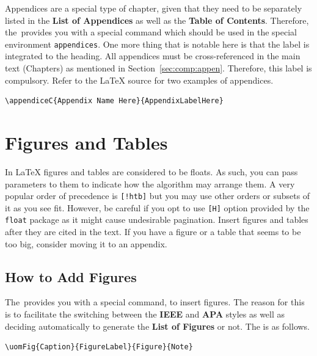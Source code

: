 \documentclass[12pt]{uomthesis}
\begin{document}
Appendices are a special type of chapter, given that they need to be separately listed in the \textbf{List of Appendices} as well as the \textbf{Table of Contents}. Therefore, the~\TheClass provides you with a special command  which should be used in the special environment \texttt{appendices}. One more thing that is notable here is that the label is integrated to the heading. All appendices must be cross-referenced in the main text (Chapters) as mentioned in Section~\ref{sec:comp:appen}. Therefore, this label is compulsory. Refer to the \LaTeX{} source for two examples of appendices.

\begin{indentedQuote}
\begin{verbatim}
\appendiceC{Appendix Name Here}{AppendixLabelHere}
\end{verbatim}
\end{indentedQuote}


\section{Figures and Tables}
\label{Sec:Latex:FigTab}

In \LaTeX{} figures and tables are considered to be floats. As such, you can pass parameters to them to indicate how the algorithm may arrange them. A very popular order of precedence is \texttt{[!htb]} but you may use other orders or subsets of it as you see fit. However, be careful if you opt to use \texttt{[H]} option provided by the  \texttt{float} package as it might cause undesirable pagination. Insert figures and tables after they are cited in the text. If you have a figure or a table that seems to be too big, consider moving it to an appendix. 


\subsection{How to Add Figures}
\label{sec:Latex:fig}

The~\TheClass provides you with a special command,  to insert figures. The reason for this is to facilitate the switching between the \textbf{IEEE} and \textbf{APA} styles as well as deciding automatically to generate the \textbf{List of Figures} or not. The  is as follows.

\begin{indentedQuote}
\begin{verbatim}
\uomFig{Caption}{FigureLabel}{Figure}{Note}
\end{verbatim}
\end{indentedQuote}
\end{document}
